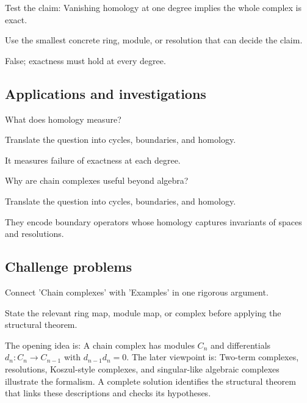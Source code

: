 \begin{exercise}\label{exr:v22-expand-12}
Test the claim: Vanishing homology at one degree implies the whole complex is exact.
\end{exercise}
\begin{hint}
Use the smallest concrete ring, module, or resolution that can decide the claim.
\end{hint}
\begin{solution}
False; exactness must hold at every degree.
\end{solution}

\subsection*{Applications and investigations}

\begin{exercise}\label{exr:v22-expand-13}
What does homology measure?
\end{exercise}
\begin{hint}
Translate the question into cycles, boundaries, and homology.
\end{hint}
\begin{solution}
It measures failure of exactness at each degree.
\end{solution}

\begin{exercise}\label{exr:v22-expand-14}
Why are chain complexes useful beyond algebra?
\end{exercise}
\begin{hint}
Translate the question into cycles, boundaries, and homology.
\end{hint}
\begin{solution}
They encode boundary operators whose homology captures invariants of spaces and resolutions.
\end{solution}

\subsection*{Challenge problems}

\begin{exercise}\label{exr:v22-expand-15}
Connect 'Chain complexes' with 'Examples' in one rigorous argument.
\end{exercise}
\begin{hint}
State the relevant ring map, module map, or complex before applying the structural theorem.
\end{hint}
\begin{solution}
The opening idea is: A chain complex has modules $C_n$ and differentials $d_n:C_n\to C_{n-1}$ with $d_{n-1}d_n=0$. The later viewpoint is: Two-term complexes, resolutions, Koszul-style complexes, and singular-like algebraic complexes illustrate the formalism. A complete solution identifies the structural theorem that links these descriptions and checks its hypotheses.
\end{solution}

